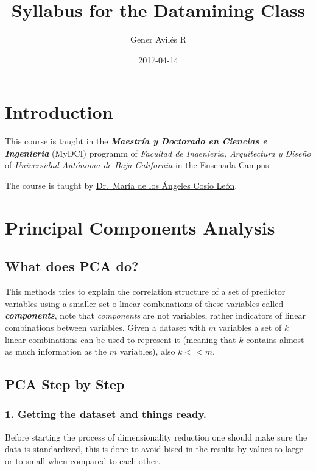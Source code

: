 \documentclass[]{book}
\title{Syllabus for the Datamining Class}
\author{Gener Avilés R}
\date{2017-04-14}
\begin{document}
\maketitle

{
\setcounter{tocdepth}{1}
\tableofcontents
}
\chapter{Introduction}\label{introduction}

This course is taught in the \textbf{\emph{Maestría y Doctorado en
Ciencias e Ingeniería}} (MyDCI) programm of \emph{Facultad de
Ingeniería, Arquitectura y Diseño} of \emph{Universidad Autónoma de Baja
California} in the Ensenada Campus.

The course is taught by
\href{https://www.researchgate.net/profile/Maria_Cosio_Leon}{Dr.~María
de los Ángeles Cosío León}.

\chapter{Principal Components Analysis}\label{intro}

\section{What does PCA do?}\label{what-does-pca-do}

This methods tries to explain the correlation structure of a set of
predictor variables using a smaller set o linear combinations of these
variables called \textbf{\emph{components}}, note that \emph{components}
are not variables, rather indicators of linear combinations between
variables. Given a dataset with \(m\) variables a set of \(k\) linear
combinations can be used to represent it (meaning that \(k\) contains
almost as much information as the \(m\) variables), also \(k<<m\).

\section{PCA Step by Step}\label{pca-step-by-step}

\subsection{1. Getting the dataset and things
ready.}\label{getting-the-dataset-and-things-ready.}

Before starting the process of dimensionality reduction one should make
sure the data is standardized, this is done to avoid bised in the
results by values to large or to small when compared to each other.
\end{document}
